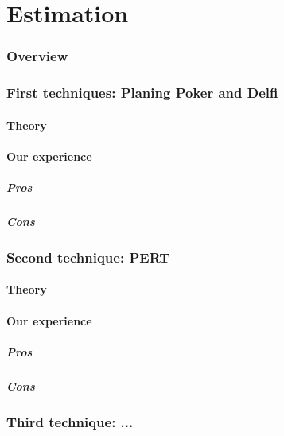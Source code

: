 \part{Estimation}
\section{Overview}
\section{First techniques: Planing Poker and Delfi}
\subsection{Theory}

\subsection{Our experience}

\subsubsection{Pros}

\subsubsection{Cons}

\section{Second technique: PERT}
\subsection{Theory}

\subsection{Our experience}

\subsubsection{Pros}

\subsubsection{Cons}

\section{Third technique: ...}
